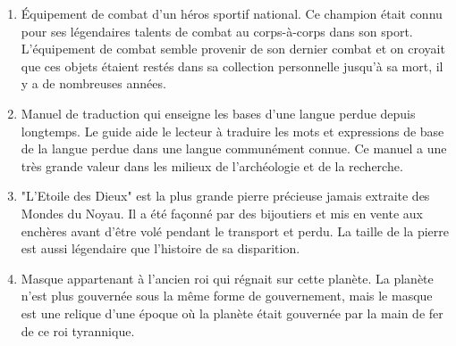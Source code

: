 \documentclass{article}
\begin{document}
\begin{enumerate}
	\item Équipement de combat d'un héros sportif national. Ce champion était connu pour ses légendaires talents de combat au corps-à-corps dans son sport. L'équipement de combat semble provenir de son dernier combat et on croyait que ces objets étaient restés dans sa collection personnelle jusqu'à sa mort, il y a de nombreuses années.
	\item Manuel de traduction qui enseigne les bases d'une langue perdue depuis longtemps. Le guide aide le lecteur à traduire les mots et expressions de base de la langue perdue dans une langue communément connue. Ce manuel a une très grande valeur dans les milieux de l'archéologie et de la recherche.
	\item "L'Etoile des Dieux" est la plus grande pierre précieuse jamais extraite des Mondes du Noyau. Il a été façonné par des bijoutiers et mis en vente aux enchères avant d'être volé pendant le transport et perdu. La taille de la pierre est aussi légendaire que l'histoire de sa disparition.
	\item Masque appartenant à l'ancien roi qui régnait sur cette planète. La planète n'est plus gouvernée sous la même forme de gouvernement, mais le masque est une relique d'une époque où la planète était gouvernée par la main de fer de ce roi tyrannique.
\end{enumerate}
\end{document}

